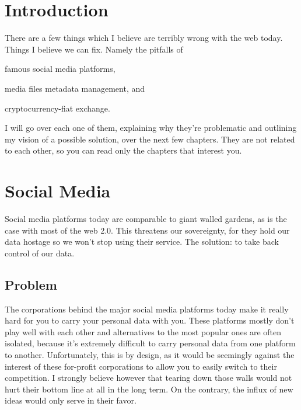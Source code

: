 \documentclass[a4paper,12pt]{report}
\begin{document}
\chapter{Introduction}

There are a few things which I believe are terribly wrong with the web today.
Things I believe we can fix.
Namely the pitfalls of
\begin{inparaenum}[i)]
  \item famous social media platforms,
  \item media files metadata management, and
  \item cryptocurrency-fiat exchange.
\end{inparaenum}
I will go over each one of them, explaining why they're problematic and outlining my vision of a possible solution, over the next few chapters.
They are not related to each other, so you can read only the chapters that interest you.


\chapter{Social Media}

Social media platforms today are comparable to giant walled gardens, as is the case with most of the web 2.0.
This threatens our sovereignty, for they hold our data hostage so we won't stop using their service.
The solution: to take back control of our data.

\section{Problem}

The corporations behind the major social media platforms today make it really hard for you to carry your personal data with you\footnotemark.
These platforms mostly don't play well with each other and alternatives to the most popular ones are often isolated, because it's extremely difficult to carry personal data from one platform to another.
Unfortunately, this is by design, as it would be seemingly against the interest of these for-profit corporations to allow you to easily switch to their competition.
I strongly believe however that tearing down those walls would not hurt their bottom line at all in the long term.
On the contrary, the influx of new ideas would only serve in their favor.
\end{document}
